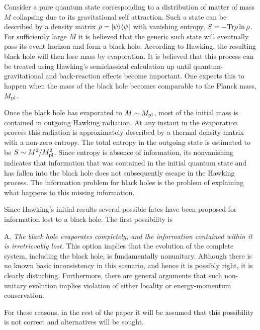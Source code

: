 {}
\itemskip
Consider a pure quantum state
corresponding to a distribution of matter of
mass $M$ collapsing due to its gravitational self attraction.  Such a
state can be described by a density matrix $\rho=\vert\psi\rangle\langle\psi\vert$
with vanishing entropy, $S=-{\rm Tr}\rho\ln\rho$.  For sufficiently
large $M$ it is believed that the generic such state will eventually
pass its event horizon and form a black hole.  According to
Hawking,
the resulting black hole will then lose mass by evaporation.  It is
believed that this process can be treated using Hawking's semiclassical
calculation up until quantum-gravitational and back-reaction
effects become important.  One expects this to happen when
the mass of the black hole becomes comparable to the Planck mass, $M_{\rm pl}$.

Once the black hole has evaporated to $M\sim M_{\rm pl}$, most of
the initial mass is contained in outgoing Hawking radiation.  At
any instant in the evaporation process this radiation is approximately
described
by a
thermal density matrix with a non-zero entropy.  The total entropy in
the outgoing state is estimated to be
$S\sim M^2/M_{\rm pl}^2$.  Since entropy is absence of information,
its nonvanishing indicates that information
that was contained in
the initial quantum state and has fallen into the black hole does
not subsequently escape in the Hawking process.  The information
problem for black holes is the problem of explaining what happens to
this missing information.

Since Hawking's initial results several possible fates have been proposed
for information
lost to a black hole.
The first possibility is

\itemskip
\item{A.}  {\it The black hole evaporates completely, and the information
contained within it is irretrievably lost.}
\itemskip
This option implies that the
evolution of the complete system, including the black hole, is
fundamentally nonunitary.  Although there is no known basic
inconsistency in this scenario, and hence it is possibly right, it
is clearly disturbing. Furthermore,
there are general arguments that such non-unitary
evolution implies violation of either locality or energy-momentum
conservation.

For these reasons, in the rest of the paper it will
be assumed that this possibility is not correct and alternatives will
be sought.

